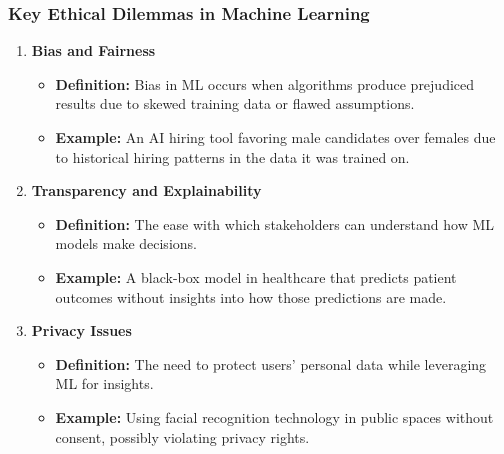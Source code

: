 \documentclass[aspectratio=169]{beamer}
\begin{document}
\begin{frame}[fragile]
    \frametitle{Key Ethical Dilemmas in Machine Learning}
    \begin{enumerate}
        \item \textbf{Bias and Fairness}
        \begin{itemize}
            \item \textbf{Definition:} Bias in ML occurs when algorithms produce prejudiced results due to skewed training data or flawed assumptions.
            \item \textbf{Example:} An AI hiring tool favoring male candidates over females due to historical hiring patterns in the data it was trained on.
        \end{itemize}

        \item \textbf{Transparency and Explainability}
        \begin{itemize}
            \item \textbf{Definition:} The ease with which stakeholders can understand how ML models make decisions.
            \item \textbf{Example:} A black-box model in healthcare that predicts patient outcomes without insights into how those predictions are made.
        \end{itemize}

        \item \textbf{Privacy Issues}
        \begin{itemize}
            \item \textbf{Definition:} The need to protect users' personal data while leveraging ML for insights.
            \item \textbf{Example:} Using facial recognition technology in public spaces without consent, possibly violating privacy rights.
        \end{itemize}
    \end{enumerate}
\end{frame}
\end{document}
